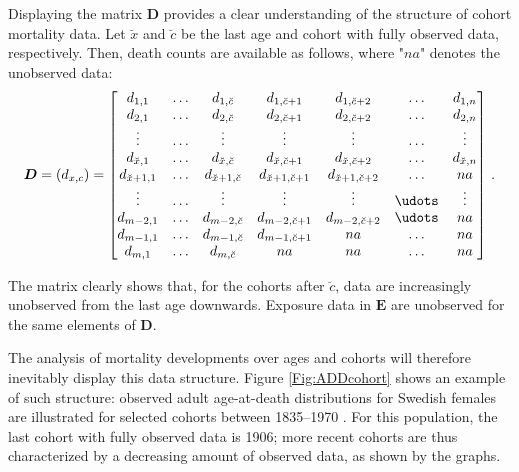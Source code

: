 \documentclass[11pt, a4paper]{article}
\newcommand{\tikzmark}[1]{\tikz[overlay,remember picture,baseline=(#1.base)]
	\node (#1) {\strut};}
\begin{document}
Displaying the matrix $\bm{D}$ provides a clear understanding of the structure of cohort mortality data.  Let $\breve{x}$ and $\breve{c}$ be the last age and cohort with fully observed data, respectively. Then, death counts are available as follows, where "$na$" denotes the unobserved data:
%
\begin{equation}\label{Eq:Dmat}
\bm{D} = (d_{{x,c}}) = \begin{bmatrix} 
d_{1,1} & \dots & d_{1,\breve{c}} & d_{1,\breve{c}+1} & d_{1,\breve{c}+2} & \dots &  d_{1,n} \\
d_{2,1} & \dots & d_{2,\breve{c}} & d_{2,\breve{c}+1} & d_{2,\breve{c}+2} & \dots &  d_{2,n} \\
\vdots & \dots & \vdots & \vdots & \vdots & \dots &   \vdots \\
d_{\breve{x},1} & \dots & d_{\breve{x},\breve{c}} & d_{\breve{x},\breve{c}+1} & d_{\breve{x},\breve{c}+2} & \dots &  d_{\breve{x},n} \\
d_{\breve{x}+1,1} & \dots & d_{\breve{x}+1,\breve{c}} & d_{\breve{x}+1,\breve{c}+1} & d_{\breve{x}+1,\breve{c}+2} & \dots &  na \\
\vdots & \dots & \vdots & \vdots & \vdots & \udots &   \vdots \\
d_{m-2,1} & \dots & d_{m-2,\breve{c}} & d_{m-2,\breve{c}+1} & d_{m-2,\breve{c}+2} & \udots  & na \\
d_{m-1,1} & \dots & d_{m-1,\breve{c}} & d_{m-1,\breve{c}+1} &  na  & \dots & na \\
\tikzmark{lower1}d_{m,1} & \dots & d_{m,\breve{c}}\tikzmark{lower2} & \tikzmark{lowerA}na  & na  & \dots & na\tikzmark{lowerB}
\end{bmatrix} \, . \notag
\end{equation}
%


\medskip The matrix clearly shows that, for the cohorts after $\breve{c}$, data are increasingly unobserved from the last age downwards. Exposure data in $\bm{E}$ are unobserved for the same elements of $\bm{D}$.  

The analysis of mortality developments over ages and cohorts will therefore inevitably display this data structure. Figure \ref{Fig:ADDcohort} shows an example of such structure: observed adult age-at-death distributions for Swedish females are illustrated for selected cohorts between 1835--1970 \cite[data retrieved from the][]{HMD}. For this population, the last cohort with fully observed data is 1906; more recent cohorts are thus characterized by a decreasing amount of observed data, as shown by the graphs.
\end{document}
